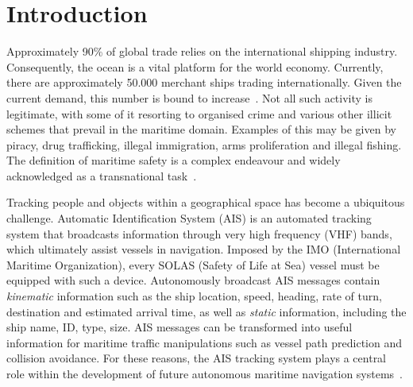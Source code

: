 \chapter{Introduction}
\label{chapter:introduction}


Approximately 90\% of global trade relies on the international shipping industry. Consequently, the ocean is a vital platform for the world economy.
Currently, there are approximately 50.000 merchant ships trading internationally. Given the current demand, this number is bound to increase~\cite{ICS}. Not all such activity is legitimate, with some of it resorting to organised crime and various other illicit schemes that prevail in the maritime domain. Examples of this may be given by piracy, drug trafficking, illegal immigration, arms proliferation and illegal fishing. The definition of maritime safety is a complex endeavour and widely acknowledged as a transnational task~\cite{Bueger2015}.

Tracking people and objects within a geographical space has become a ubiquitous challenge. Automatic Identification System (AIS)\label{label_AIS} is an automated tracking system that broadcasts information through very high frequency (VHF) bands, which ultimately assist vessels in navigation. Imposed by the IMO (International Maritime Organization),\label{label_IMO} every SOLAS
(Safety of Life at Sea) \label{label_SOLAS} vessel must be equipped with such a device.
Autonomously broadcast AIS messages contain \emph{kinematic} information such as the ship location, speed, heading, rate of turn, destination and estimated arrival time, as well as \emph{static} information, including the ship name, ID, type, size. AIS messages can be transformed into useful information for maritime traffic manipulations such as vessel path prediction and collision avoidance. For these reasons, the AIS tracking system plays a central role within the development of future autonomous maritime navigation systems~\cite{Mao2016}.

